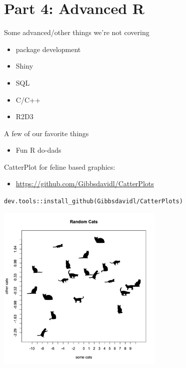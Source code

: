 \documentclass[
  ignorenonframetext,
]{beamer}
\providecommand{\tightlist}{%
  \setlength{\itemsep}{0pt}\setlength{\parskip}{0pt}}
\begin{document}
\hypertarget{part-4-advanced-r}{%
\section{Part 4: Advanced R}\label{part-4-advanced-r}}

\begin{frame}{Some advanced/other things we're not covering}
\protect\hypertarget{some-advancedother-things-were-not-covering}{}

\begin{itemize}
\tightlist
\item
  package development
\item
  Shiny
\item
  SQL
\item
  C/C++
\item
  R2D3
\end{itemize}

\end{frame}

\begin{frame}{A few of our favorite things}
\protect\hypertarget{a-few-of-our-favorite-things}{}

\begin{itemize}
\tightlist
\item
  Fun R do-dads
\end{itemize}

\end{frame}

\begin{frame}[fragile]{CatterPlot for feline based graphics:}
\protect\hypertarget{catterplot-for-feline-based-graphics}{}

\begin{itemize}
\tightlist
\item
  \url{https://github.com/Gibbsdavidl/CatterPlots}
\end{itemize}

\texttt{dev.tools::install\_github(Gibbsdavidl/CatterPlots)}

\includegraphics[width=0.6\textwidth,height=\textheight]{../external/images/funR_1_catterplotter.png}

\end{frame}
\end{document}
